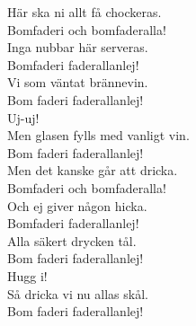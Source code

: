 \documentclass[a6paper,10pt]{article}
\begin{document}
\setlength{\oddsidemargin}{-0.37in}
\noindent
\begin{center}
\end{center}
\begin{lyrics}
Här ska ni allt få chockeras.\\
Bomfaderi och bomfaderalla!\\
Inga nubbar här serveras.\\
Bomfaderi faderallanlej!
\vspace{5pt}\\
Vi som väntat brännevin.\\
Bom faderi faderallanlej!\\
Uj-uj!\\
Men glasen fylls med vanligt vin.\\
Bom faderi faderallanlej!
\vspace{5pt}\\
Men det kanske går att dricka.\\
Bomfaderi och bomfaderalla!\\
Och ej giver någon hicka.\\
Bomfaderi faderallanlej!
\vspace{5pt}\\
Alla säkert drycken tål.\\
Bom faderi faderallanlej!\\
Hugg i!\\
Så dricka vi nu allas skål.\\
Bom faderi faderallanlej!
\end{lyrics}
\end{document}

